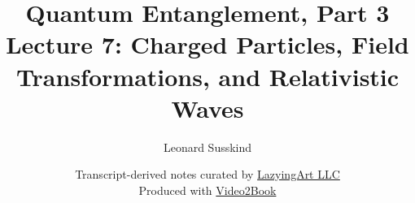 \documentclass[11pt,oneside]{book}
\begin{document}
\hypersetup{pageanchor=false}
\frontmatter
\title{Quantum Entanglement, Part 3\\[0.45em]
\large Lecture 7: Charged Particles, Field Transformations, and Relativistic Waves}
\author{Leonard Susskind}
\date{Transcript-derived notes curated by
\href{https://lazying.art}{LazyingArt LLC}\\[0.35em]
\small Produced with
\href{https://github.com/lachlanchen/Video2Book}{Video2Book}}
\maketitle
\hypersetup{pageanchor=true}
\mainmatter

\end{document}
